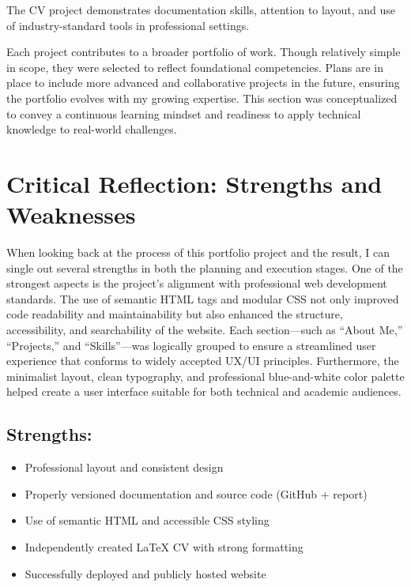 \documentclass[11pt,a4paper]{article}
\begin{document}
The CV project demonstrates documentation skills, attention to layout, and use of industry-standard tools in professional settings.

Each project contributes to a broader portfolio of work. Though relatively simple in scope, they were selected to reflect foundational competencies. Plans are in place to include more advanced and collaborative projects in the future, ensuring the portfolio evolves with my growing expertise. This section was conceptualized to convey a continuous learning mindset and readiness to apply technical knowledge to real-world challenges.

\section*{Critical Reflection: Strengths and Weaknesses}

When looking back at the process of this portfolio project and the result, I can single out several strengths in both the planning and execution stages. One of the strongest aspects is the project’s alignment with professional web development standards. The use of semantic HTML tags and modular CSS not only improved code readability and maintainability but also enhanced the structure, accessibility, and searchability of the website. Each section—such as “About Me,” “Projects,” and “Skills”—was logically grouped to ensure a streamlined user experience that conforms to widely accepted UX/UI principles. Furthermore, the minimalist layout, clean typography, and professional blue-and-white color palette helped create a user interface suitable for both technical and academic audiences.

\subsection*{Strengths:}

\begin{itemize}
    \item Professional layout and consistent design
    \item Properly versioned documentation and source code (GitHub + report)
    \item Use of semantic HTML and accessible CSS styling
    \item Independently created LaTeX CV with strong formatting
    \item Successfully deployed and publicly hosted website
\end{itemize}
\end{document}
